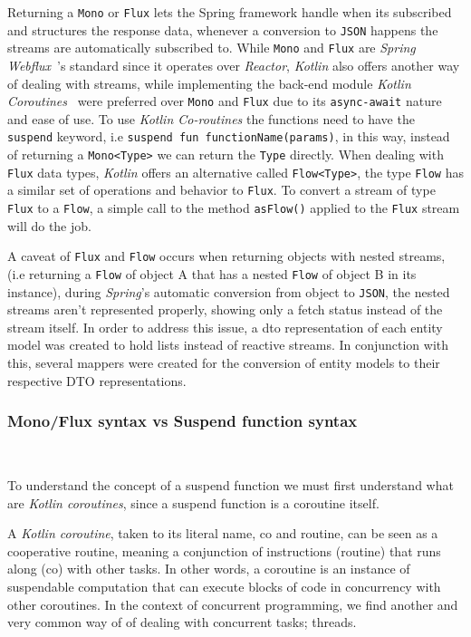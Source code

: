 Returning a \texttt{Mono} or \texttt{Flux} lets the Spring framework handle when its subscribed and structures the response data, whenever a conversion to \texttt{JSON} happens the streams are automatically subscribed to.
While \texttt{Mono} and \texttt{Flux} are \textit{Spring Webflux}~\cite{spring-webflux}'s standard since it operates over \textit{Reactor}, \textit{Kotlin} also offers another way of dealing with streams, while implementing the back-end module \textit{Kotlin Coroutines}~\cite{kotlin-coroutines} were preferred over \texttt{Mono} and \texttt{Flux} due to its \texttt{async-await} nature and ease of use. To use \textit{Kotlin Co-routines} the functions need to have the \texttt{suspend} keyword, i.e \texttt{suspend fun functionName(params)}, in this way, instead of returning a \texttt{Mono<Type>} we can return the \texttt{Type} directly. When dealing with \texttt{Flux} data types, \textit{Kotlin} offers an alternative called \texttt{Flow<Type>}, the type \texttt{Flow} has a similar set of operations and behavior to \texttt{Flux}. To convert a stream of type \texttt{Flux} to a \texttt{Flow}, a simple call to the method \texttt{asFlow()} applied to the \texttt{Flux} stream will do the job.

A caveat of \texttt{Flux} and \texttt{Flow} occurs when returning objects with nested streams, (i.e returning a \texttt{Flow} of object A that has a nested \texttt{Flow} of object B in its instance), during \textit{Spring}'s automatic conversion from object to \texttt{JSON}, the nested streams aren't represented properly, showing only a fetch status instead of the stream itself. In order to address this issue, a \acrfull{dto} representation of each entity model was created to hold lists instead of reactive streams. In conjunction with this, several mappers were created for the conversion of entity models to their respective DTO representations.


\subsubsection{Mono/Flux syntax vs Suspend function syntax}~\label{subsubsec:kotlin-coroutines}

To understand the concept of a suspend function we must first understand what are \textit{Kotlin coroutines}, since a suspend function is a coroutine itself.

A \textit{Kotlin coroutine}, taken to its literal name, co and routine, can be seen as a cooperative routine, meaning a conjunction of instructions (routine) that runs along (co) with other tasks. In other words, a coroutine is an instance of suspendable computation that can execute blocks of code in concurrency with other coroutines.
In the context of concurrent programming, we find another and very common way of of dealing with concurrent tasks; threads. 

